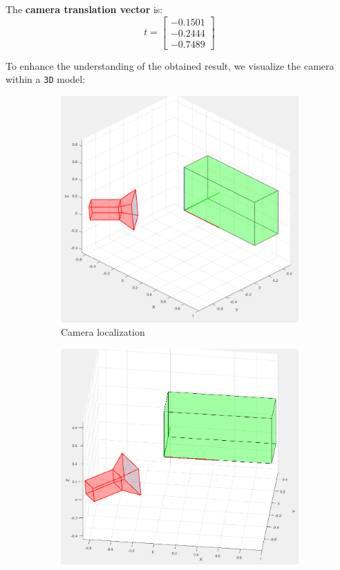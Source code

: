 The \textbf{camera translation vector} is:
\begin{equation}
    t =
    \begin{bmatrix}
        -0.1501 \\
        -0.2444 \\
        -0.7489
    \end{bmatrix}
\end{equation}
   
To enhance the understanding of the obtained result, we visualize the camera within a \verb|3D| model:
\begin{figure}[H]
     \centering
     \begin{subfigure}[b]{0.49\textwidth}
         \centering
         \includegraphics[width=\textwidth]{img/G6/loc1.jpg}
         \caption{Camera localization}
     \end{subfigure}
     \hfill
     \begin{subfigure}[b]{0.49\textwidth}
         \centering
         \includegraphics[width=\textwidth]{img/G6/loc2.jpg}

\end{subfigure}
\end{figure}
